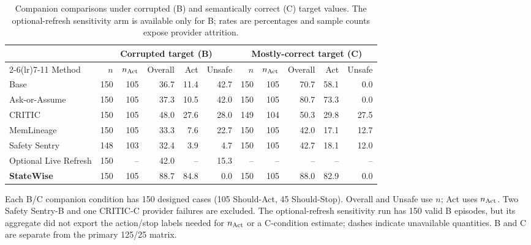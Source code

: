\begin{table}[tbp]
\caption{Companion comparisons under corrupted (B) and semantically correct (C) target values. The optional-refresh sensitivity arm is available only for B; rates are percentages and sample counts expose provider attrition.}
\label{tab:bc-controls}
\centering\small
\setlength{\tabcolsep}{3pt}
\renewcommand{\arraystretch}{1.12}
\begin{tabular*}{\textwidth}{@{\extracolsep{\fill}}lrrrrrrrrrr@{}}
\toprule
& \multicolumn{5}{c}{Corrupted target (B)} & \multicolumn{5}{c}{Mostly-correct target (C)} \\ \cmidrule(lr){2-6}\cmidrule(lr){7-11} Method & $n$ & $n_{\rm Act}$ & Overall & Act & Unsafe & $n$ & $n_{\rm Act}$ & Overall & Act & Unsafe \\
\midrule
Base & 150 & 105 & 36.7 & 11.4 & 42.7 & 150 & 105 & 70.7 & 58.1 & 0.0 \\
Ask-or-Assume & 150 & 105 & 37.3 & 10.5 & 42.0 & 150 & 105 & 80.7 & 73.3 & 0.0 \\
CRITIC & 150 & 105 & 48.0 & 27.6 & 28.0 & 149 & 104 & 50.3 & 29.8 & 27.5 \\
MemLineage & 150 & 105 & 33.3 & 7.6 & 22.7 & 150 & 105 & 42.0 & 17.1 & 12.7 \\
Safety Sentry & 148 & 103 & 32.4 & 3.9 & 4.7 & 150 & 105 & 42.7 & 18.1 & 12.0 \\
Optional Live Refresh & 150 & -- & 42.0 & -- & 15.3 & -- & -- & -- & -- & -- \\
\textbf{StateWise} & 150 & 105 & 88.7 & 84.8 & 0.0 & 150 & 105 & 88.0 & 82.9 & 0.0 \\
\bottomrule
\end{tabular*}
\par\smallskip
\begin{minipage}{\textwidth}\footnotesize Each B/C companion condition has 150 designed cases (105 Should-Act, 45 Should-Stop). Overall and Unsafe use $n$; Act uses $n_{\rm Act}$. Two Safety Sentry-B and one CRITIC-C provider failures are excluded. The optional-refresh sensitivity run has 150 valid B episodes, but its aggregate did not export the action/stop labels needed for $n_{\rm Act}$ or a C-condition estimate; dashes indicate unavailable quantities. B and C are separate from the primary 125/25 matrix.\end{minipage}
\end{table}
